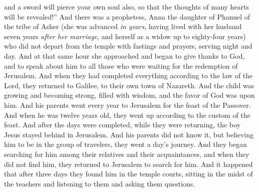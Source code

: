 \begin{biblechapter}
\verse and a sword will pierce your own soul also, so that the thoughts of many hearts will be revealed!”
 And there was a prophetess, Anna the daughter of Phanuel of the tribe of Asher (she was advanced \textit{in years}, having lived with her husband seven years \textit{after her marriage},
\verse and herself as a widow up to eighty-four years) who did not depart from the temple with fastings and prayers, serving night and day.
\verse And at that same hour she approached and began to give thanks to God, and to speak about him to all those who were waiting for the redemption of Jerusalem.
\verse And when they had completed everything according to the law of the Lord, they returned to Galilee, to their own town of Nazareth.
\verse And the child was growing and becoming strong, filled with wisdom, and the favor of God was upon him.
 And his parents went every year to Jerusalem for the feast of the Passover.
\verse And when he was twelve years old, they went up according to the custom of the feast.
\verse And after the days were completed, while they were returning, the boy Jesus stayed behind in Jerusalem. And his parents did not know it,
\verse but believing him to be in the group of travelers, they went a day’s journey. And they began searching for him among their relatives and their acquaintances,
\verse and when they did not find him, they returned to Jerusalem to search for him.
\verse And it happened that after three days they found him in the temple courts, sitting in the midst of the teachers and listening to them and asking them questions.

\end{biblechapter}
